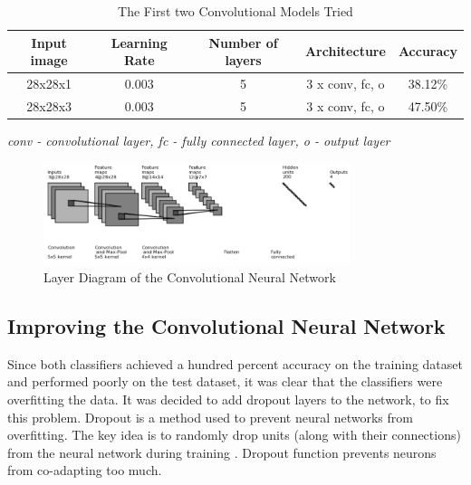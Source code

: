 \begin{table}[h]
\begin{center}
\begin{tabular}{ |c|c|c|c|c| }
\hline
 Input image&Learning Rate &   Number of layers & Architecture & Accuracy \\   \hline
28x28x1 & 0.003   &   5  &  3 x conv, fc, o  & 38.12\% \\
28x28x3 & 0.003   &   5  &  3 x conv, fc, o  & 47.50\% \\
 \hline
\end{tabular}
\caption{The First two Convolutional Models Tried}

\label{table:convi}
\medskip
\textit{ conv - convolutional layer, fc - fully connected layer, o - output layer}
\end{center}
\end{table}


\begin{figure}[h]
\centering
\includegraphics[width=0.8\textwidth]{Figures/4/conv_diagram.PNG}
\caption{Layer Diagram  of the  Convolutional Neural Network }
\label{fig:conv2}
\end{figure}


\subsection{Improving the Convolutional Neural Network}

Since both classifiers achieved a hundred percent accuracy on the training dataset and performed poorly on the test dataset, it was clear that the classifiers were overfitting the data. It was decided to add dropout layers to the network, to fix this problem. Dropout is a method used to prevent neural networks from overfitting. The key idea is to randomly drop units (along with their connections) from the neural network during training \citep{dropout}. Dropout function prevents neurons from co-adapting too much. 

